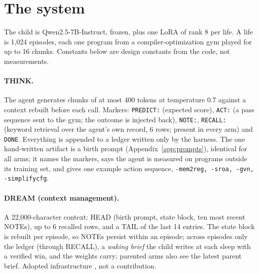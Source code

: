 \documentclass{article}
\begin{document}
\section{The system}
\label{sec:system}

The child is Qwen2.5-7B-Instruct, frozen, plus one LoRA of rank 8 per life. A life is 1{,}024 episodes, each one program from a compiler-optimization gym played for up to 16 chunks. Constants below are design constants from the code, not measurements.

\paragraph{THINK.} The agent generates chunks of at most 400 tokens at temperature 0.7 against a context rebuilt before each call. Markers: \texttt{PREDICT:} (expected score), \texttt{ACT:} (a pass sequence sent to the gym; the outcome is injected back), \texttt{NOTE:}, \texttt{RECALL:} (keyword retrieval over the agent's own record, 6 rows; present in every arm) and \texttt{DONE}. Everything is appended to a ledger written only by the harness. The one hand-written artifact is a birth prompt (Appendix~\ref{app:prompts}), identical for all arms; it names the markers, says the agent is measured on programs outside its training set, and gives one example action sequence, \texttt{-mem2reg, -sroa, -gvn, -simplifycfg}.

\paragraph{DREAM (context management).} A 22{,}000-character context: HEAD (birth prompt, state block, ten most recent NOTEs), up to 6 recalled rows, and a TAIL of the last 14 entries. The state block is rebuilt per episode, so NOTEs persist within an episode; across episodes only the ledger (through RECALL), a \emph{waking brief} the child writes at each sleep with a verified win, and the weights carry; parented arms also see the latest parent brief. Adopted infrastructure \citep{park2023generative,packer2023memgpt}, not a contribution.
\end{document}
